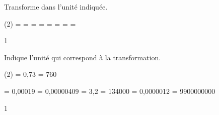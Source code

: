 \documentclass[a4paper,11pt]{report}
\begin{document}
\begin{exop}
{
Transforme dans l'unité indiquée.
\begin{tasks}(2)
    \task {}= \dotfill \hspace{0.3cm}
     \hspace{0.3cm}
    \task {} = \dotfill \hspace{0.3cm}
     \hspace{0.3cm}
  \task {}= \dotfill \hspace{0.3cm}
     \hspace{0.3cm}
    \task {}= \dotfill \hspace{0.3cm}
     \hspace{0.3cm}
     \task {}= \dotfill \hspace{0.3cm}
     \hspace{0.3cm}
     \task {}= \dotfill \hspace{0.3cm}
     \hspace{0.3cm}
     \task {}= \dotfill \hspace{0.3cm}
     \hspace{0.3cm}
     \task {}= \dotfill \hspace{0.3cm}
     \hspace{0.3cm}
\end{tasks} 
}
{1}
\end{exop}


\begin{exop}
{
	Indique l'unité qui correspond à la transformation.
\begin{tasks}(2)
    \task {}= 0,73\dotfill \hspace{0.3cm}
    \task {} = 760 \dotfill \hspace{0.3cm}

  \task {}= 0,00019\dotfill \hspace{0.3cm}
    \task {}= 0,00000409\dotfill \hspace{0.3cm}
     \task {}= 3,2\dotfill \hspace{0.3cm}
     \task {}= 134000\dotfill \hspace{0.3cm}
     \task {}= 0,0000012\dotfill \hspace{0.3cm}
     \task {}= 9900000000\dotfill \hspace{0.3cm}
\end{tasks} 
}
{1}
\end{exop}
\end{document}
